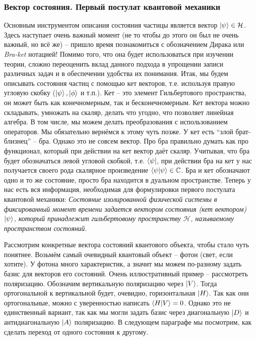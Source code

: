 \subsubsection*{Вектор состояния. Первый постулат квантовой механики}
\hspace{1em} Основным инструментом описания состояния частицы является вектор $\ket{\psi} \in \mathcal{H}$. Здесь наступает очень важный момент (не то чтобы до этого он был не очень важный, но всё же) -- пришло время познакомиться с обозначением Дирака или \textit{Bra-ket} нотацией! Помимо того, что она будет использоваться при изучении теории, сложно переоценить вклад данного подхода в упрощении записи различных задач и в обеспечении удобства их понимания. Итак, мы будем описывать состояния частиц с помощью кет векторов, т.е. используя правую угловую скобку ($\ket{\psi}, \ket{\phi}$ и т.п.). Кет -- это элемент Гильбертового пространства, он может быть как конечномерным, так и бесконечномерным. Кет вектора можно складывать, умножать на скаляр, делать что угодно, что позволяет линейная алгебра. В том числе, мы можем делать преобразования с использованием операторов. Мы обязательно вернёмся к этому чуть позже. У кет есть ``злой брат-близнец'' -- бра. Однако это не совсем вектор. Про бра правильно думать как про функционал, который при действии на кет вектор даёт скаляр. Учитывая, что бра будет обозначаться левой угловой скобкой, т.е. $\bra{\psi}$, при действии бра на кет у нас получается своего рода скалярное произведение $\bra{\psi}\ket{\psi} \in \mathbb{C}$. Бра и кет обозначают одно и то же состояние, просто бра находится в дуальном пространстве. Теперь у нас есть вся информация, необходимая для формулировки первого постулата квантовой механики: \textit{Состояние изолированной физической системы в фиксированный момент времени задается вектором состояния (кет вектором) $\ket{\psi}$, который принадлежит гильбертовому пространству $\mathcal{H}$, называемому пространством состояний.}

Рассмотрим конкретные вектора состояний квантового объекта, чтобы стало чуть понятнее. Возьмём самый очевидный квантовый объект -- фотон (свет, если хотите). У фотона много характеристик, а значит мы можем по-разному задать базис для векторов его состояний. Очень иллюстративный пример -- рассмотреть поляризацию. Обозначим вертикальную поляризацию через $\ket{V}$. Тогда ортогональной к вертикальной будет, очевидно, горизонтальная $\ket{H}$. Так как они ортогональные, можно с уверенностью написать $\bra{H}\ket{V} = 0$. Однако это не единственный вариант, так как мы могли задать базис через диагональную $\ket{D}$ и антидиагональную $\ket{A}$ поляризацию. В следующем параграфе мы посмотрим, как сделать переход от одного состояния к другому.

